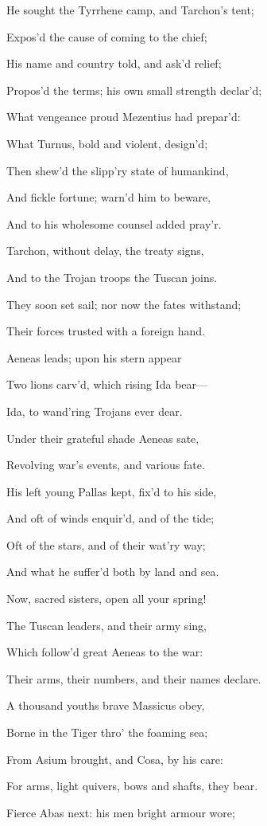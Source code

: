 He sought the Tyrrhene camp, and Tarchon’s tent;

Expos’d the cause of coming to the chief;

His name and country told, and ask’d relief;

Propos’d the terms; his own small strength declar’d;

What vengeance proud Mezentius had prepar’d:

What Turnus, bold and violent, design’d;

Then shew’d the slipp’ry state of humankind,

And fickle fortune; warn’d him to beware,

And to his wholesome counsel added pray’r.

Tarchon, without delay, the treaty signs,

And to the Trojan troops the Tuscan joins.

They soon set sail; nor now the fates withstand;

Their forces trusted with a foreign hand.

Aeneas leads; upon his stern appear

Two lions carv’d, which rising Ida bear—

Ida, to wand’ring Trojans ever dear.

Under their grateful shade Aeneas sate,

Revolving war’s events, and various fate.

His left young Pallas kept, fix’d to his side,

And oft of winds enquir’d, and of the tide;

Oft of the stars, and of their wat’ry way;

And what he suffer’d both by land and sea.

Now, sacred sisters, open all your spring!

The Tuscan leaders, and their army sing,

Which follow’d great Aeneas to the war:

Their arms, their numbers, and their names declare.

A thousand youths brave Massicus obey,

Borne in the Tiger thro’ the foaming sea;

From Asium brought, and Cosa, by his care:

For arms, light quivers, bows and shafts, they bear.

Fierce Abas next: his men bright armour wore;


